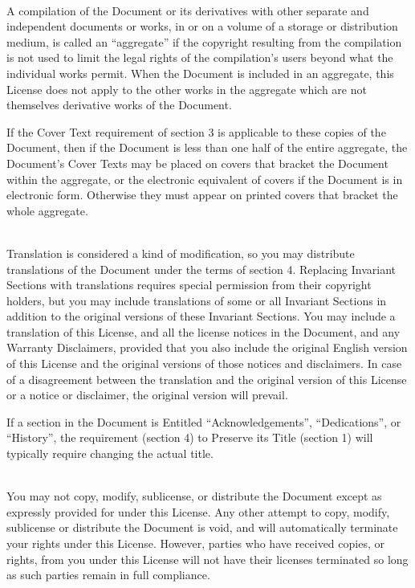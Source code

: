 \bigskip{}\\

\noindent
A compilation of the Document or its derivatives with other separate and independent documents or works, in or on a volume of a storage or distribution medium, is called an "`aggregate"' if the copyright resulting from the compilation is not used to limit the legal rights of the compilation's users beyond what the individual works permit. When the Document is included in an aggregate, this License does not apply to the other works in the aggregate which are not themselves derivative works of the Document.

If the Cover Text requirement of section 3 is applicable to these copies of the Document, then if the Document is less than one half of the entire aggregate, the Document's Cover Texts may be placed on covers that bracket the Document within the aggregate, or the electronic equivalent of covers if the Document is in electronic form. Otherwise they must appear on printed covers that bracket the whole aggregate.


\bigskip{}\\

\noindent
Translation is considered a kind of modification, so you may distribute translations of the Document under the terms of section 4. Replacing Invariant Sections with translations requires special permission from their copyright holders, but you may include translations of some or all Invariant Sections in addition to the original versions of these Invariant Sections.  You may include a translation of this License, and all the license notices in the Document, and any Warranty Disclaimers, provided that you also include the original English version of this License and the original versions of those notices and disclaimers.  In case of a disagreement between the translation and the original version of this License or a notice or disclaimer, the original version will prevail.

If a section in the Document is Entitled "`Acknowledgements"', "`Dedications"', or "`History"', the requirement (section 4) to Preserve its Title (section 1) will typically require changing the actual title.


\bigskip{}\\

\noindent
You may not copy, modify, sublicense, or distribute the Document except as expressly provided for under this License.  Any other attempt to copy, modify, sublicense or distribute the Document is void, and will automatically terminate your rights under this License.  However, parties who have received copies, or rights, from you under this License will not have their licenses terminated so long as such parties remain in full compliance.


